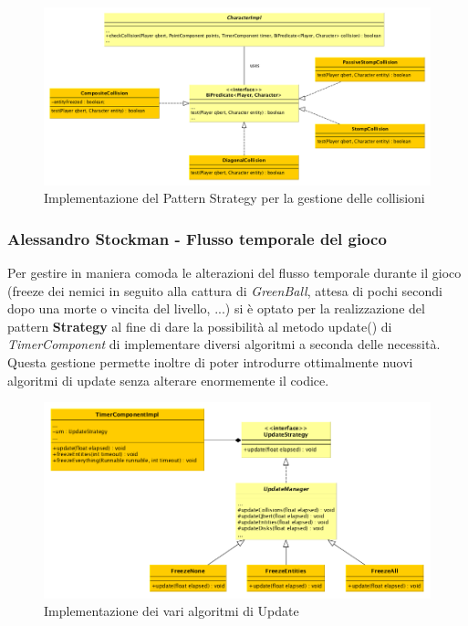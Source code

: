 \documentclass[a4paper,12pt, hidelinks]{report}
\begin{document}
\begin{figure}[H]
\centering{}
\includegraphics[width=\linewidth]{img/CollisionStrategy}
\caption{Implementazione del Pattern Strategy per la gestione delle collisioni}
\label{img:CollisionStrategy}
\end{figure}

\begin{flushright}
\item\subsubsection{Alessandro Stockman - Flusso temporale del gioco}
\end{flushright}

Per gestire in maniera comoda le alterazioni del flusso temporale durante il gioco (freeze dei nemici in seguito alla cattura di \emph{GreenBall}, attesa di pochi secondi dopo una morte o vincita del livello, ...) si è optato per la realizzazione del pattern \textbf{Strategy} al fine di dare la possibilità al metodo update() di \emph{TimerComponent} di implementare diversi algoritmi a seconda delle necessità.
Questa gestione permette inoltre di poter introdurre ottimalmente nuovi algoritmi di update senza alterare enormemente il codice.

\begin{figure}[H]
\centering{}
\includegraphics[width=\linewidth]{img/UpdateStrategy}
\caption{Implementazione dei vari algoritmi di Update}
\label{img:UpdateStrategy}
\end{figure}
\end{document}
